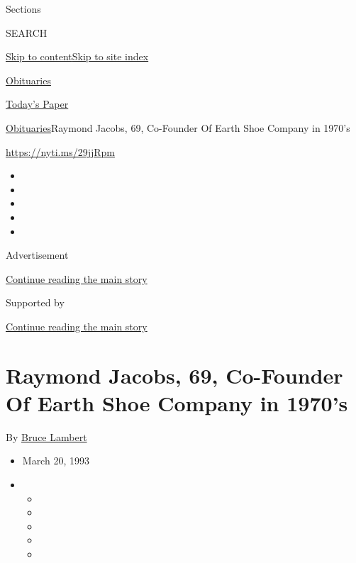 Sections

SEARCH

\protect\hyperlink{site-content}{Skip to
content}\protect\hyperlink{site-index}{Skip to site index}

\href{https://www.nytimes3xbfgragh.onion/section/obituaries}{Obituaries}

\href{https://myaccount.nytimes3xbfgragh.onion/auth/login?response_type=cookie\&client_id=vi}{}

\href{https://www.nytimes3xbfgragh.onion/section/todayspaper}{Today's
Paper}

\href{/section/obituaries}{Obituaries}\textbar{}Raymond Jacobs, 69,
Co-Founder Of Earth Shoe Company in 1970's

\url{https://nyti.ms/29jjRpm}

\begin{itemize}
\item
\item
\item
\item
\item
\end{itemize}

Advertisement

\protect\hyperlink{after-top}{Continue reading the main story}

Supported by

\protect\hyperlink{after-sponsor}{Continue reading the main story}

\hypertarget{raymond-jacobs-69-co-founder-of-earth-shoe-company-in-1970s}{%
\section{Raymond Jacobs, 69, Co-Founder Of Earth Shoe Company in
1970's}\label{raymond-jacobs-69-co-founder-of-earth-shoe-company-in-1970s}}

By \href{https://www.nytimes3xbfgragh.onion/by/bruce-lambert}{Bruce
Lambert}

\begin{itemize}
\item
  March 20, 1993
\item
  \begin{itemize}
  \item
  \item
  \item
  \item
  \item
  \end{itemize}
\end{itemize}

